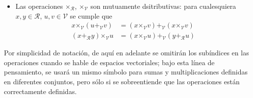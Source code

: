 \begin{definicion}
\begin{itemize}
\item Las operaciones $\boldsymbol{\times}_\mathcal{R}$, $\boldsymbol{\times}_\mathcal{V}$ son mutuamente dsitributivas: para cualesquiera $x, y \in \mathcal{R}$, $u, v \in \mathcal{V}$ se cumple que
\begin{align*}
x \boldsymbol{\times}_\mathcal{V} (u \boldsymbol{+}_\mathcal{V} v) &= (x \boldsymbol{\times}_\mathcal{V} v ) \boldsymbol{+}_\mathcal{V} (x \boldsymbol{\times}_\mathcal{V} v) \\
(x \boldsymbol{+}_\mathcal{R} y) \boldsymbol{\times}_\mathcal{V} u &= (x \boldsymbol{\times}_\mathcal{V} u ) \boldsymbol{+}_\mathcal{V} ( y \boldsymbol{+}_\mathcal{R} u)
\end{align*}
\end{itemize}
\end{definicion}

Por simplicidad de notación, de aquí en adelante se omitirán los subíndices en las operaciones cuando se hable de espacios vectoriales;
bajo esta línea de pensamiento, se usará un mismo símbolo para sumas y multiplicaciones definidas en diferentes conjuntos, pero sólo si se sobreentiende que las operaciones están correctamente definidas.


